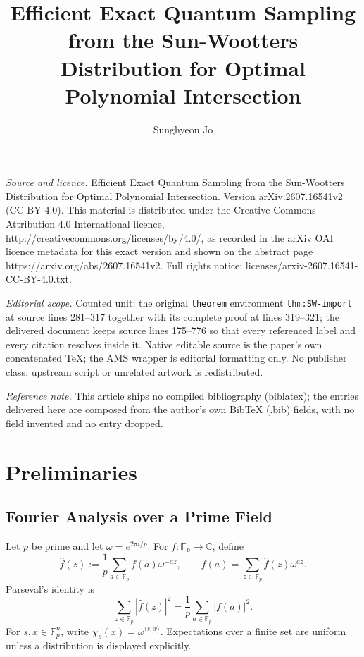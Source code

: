\documentclass[10pt,a4paper]{amsart}
\newcommand{\F}{\mathbb{F}}
\newcommand{\abs}[1]{\left\lvert #1\right\rvert}
\begin{document}
\title[Efficient Exact Quantum Sampling from the Sun-Wootters Distr]{Efficient Exact Quantum Sampling from the Sun-Wootters Distribution for Optimal Polynomial Intersection}
\author{Sunghyeon Jo}
\date{}
\maketitle
\noindent\emph{Source and licence.} Efficient Exact Quantum Sampling from the Sun-Wootters Distribution for Optimal Polynomial Intersection. Version arXiv:2607.16541v2 (CC BY 4.0). This material is distributed under the Creative Commons Attribution 4.0 International licence, http://creativecommons.org/licenses/by/4.0/, as recorded in the arXiv OAI licence metadata for this exact version and shown on the abstract page https://arxiv.org/abs/2607.16541v2. Full rights notice: licenses/arxiv-2607.16541-CC-BY-4.0.txt.\par\smallskip
\noindent\textit{Editorial scope.} Counted unit: the original \texttt{theorem} environment \texttt{thm:SW-import} at source lines 281--317 together with its complete proof at lines 319--321; the delivered document keeps source lines 175--776 so that every referenced label and every citation resolves inside it. Native editable source is the paper's own concatenated TeX; the AMS wrapper is editorial formatting only. No publisher class, upstream script or unrelated artwork is redistributed.
\par\smallskip\noindent\textit{Reference note.} This article ships no compiled bibliography (biblatex); the entries delivered here are composed from the author's own BibTeX (.bib) fields, with no field invented and no entry dropped.
\section{Preliminaries}

\subsection{Fourier Analysis over a Prime Field}

Let $p$ be prime and let $\omega=e^{2\pi i/p}$.  For $f:\F_p\to\mathbb C$, define
\begin{equation}
   \widehat f(z):=\frac1p\sum_{a\in\F_p} f(a)\omega^{-az},
   \qquad
   f(a)=\sum_{z\in\F_p}\widehat f(z)\omega^{az}.
   \label{eq:fourier-convention}
\end{equation}
Parseval's identity is
\begin{equation}
   \sum_{z\in\F_p}\abs{\widehat f(z)}^2
   =\frac1p\sum_{a\in\F_p}\abs{f(a)}^2.
   \label{eq:parseval-one-dimensional}
\end{equation}
For $s,x\in\F_p^n$, write $\chi_s(x)=\omega^{\langle s,x\rangle}$.  Expectations over a finite set are uniform unless a distribution is displayed explicitly.
\end{document}
